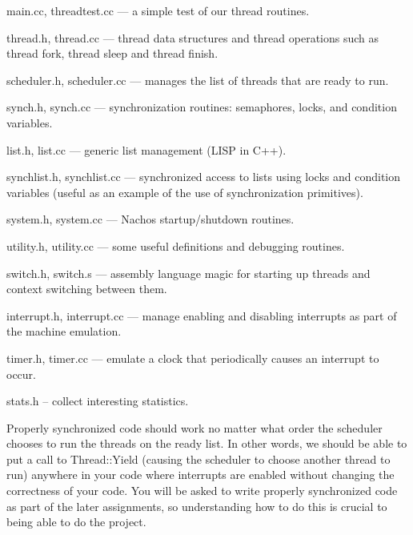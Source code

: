 \begin{description}

\item main.cc, threadtest.cc --- a simple test of our thread routines.

\item thread.h, thread.cc --- thread data structures and
thread operations such as thread fork, thread sleep and thread finish.

\item scheduler.h, scheduler.cc --- manages the list of threads that
are ready to run.

\item synch.h, synch.cc --- synchronization routines: semaphores, locks,
and condition variables.

\item list.h, list.cc --- generic list management (LISP in C++).

\item synchlist.h, synchlist.cc --- synchronized access to lists using
locks and condition variables (useful as an example of the use
of synchronization primitives).

\item system.h, system.cc --- Nachos startup/shutdown routines.

\item utility.h, utility.cc --- some useful definitions and debugging routines.

\item switch.h, switch.s --- assembly language magic for starting
up threads and context switching between them.

\item interrupt.h, interrupt.cc --- manage enabling and disabling
interrupts as part of the machine emulation.

\item timer.h, timer.cc --- emulate a clock that periodically causes
an interrupt to occur.

\item stats.h -- collect interesting statistics.

\end{description}

Properly synchronized code should work no matter what order the
scheduler chooses to run the threads on the ready list.  In other
words, we should be able to put a call to Thread::Yield (causing the scheduler
to choose another thread to run) anywhere in your code where interrupts
are enabled without changing the correctness of your code.
You will be asked to write properly synchronized code as part of the
later assignments, so understanding how to do this is crucial to
being able to do the project.

